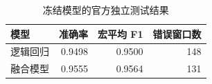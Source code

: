 \begin{table}[htbp]\centering\small
\caption{冻结模型的官方独立测试结果}\label{tab:test}
\begin{tabular}{lrrr}\toprule
模型 & 准确率 & 宏平均 F1 & 错误窗口数\\\midrule
逻辑回归 & 0.9498 & 0.9500 & 148\\
融合模型 & 0.9555 & 0.9564 & 131\\
\bottomrule\end{tabular}
\end{table}

